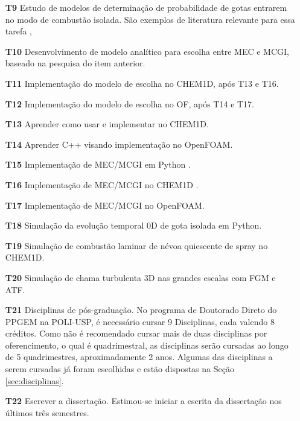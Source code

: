 \begin{itemize}
    \item[\textbf{T9 }] Estudo de modelos de determinação de probabilidade de gotas entrarem no modo de combustão isolada. São exemplos de literatura relevante para essa tarefa \cite{AggarwalS2014}, \source{}
    \item[\textbf{T10}] Desenvolvimento de modelo analítico para escolha entre MEC e MCGI, baseado na pesquisa do item anterior.
    \item[\textbf{T11}] Implementação do modelo de escolha no CHEM1D, após T13 e T16.
    \item[\textbf{T12}] Implementação do modelo de escolha no OF, após T14 e T17.
    
    \item[\textbf{T13}] Aprender como usar e implementar no CHEM1D.
    \item[\textbf{T14}] Aprender C++ visando implementação no OpenFOAM.
    
    \item[\textbf{T15}] Implementação de MEC/MCGI em Python  .%
    \item[\textbf{T16}] Implementação de MEC/MCGI no CHEM1D  .%
    \item[\textbf{T17}] Implementação de MEC/MCGI no OpenFOAM.%
    
    \item[\textbf{T18}] Simulação da evolução temporal 0D de gota isolada em Python.           %
    \item[\textbf{T19}] Simulação de combustão laminar de névoa quiescente de spray no CHEM1D. %
    \item[\textbf{T20}] Simulação de chama turbulenta 3D nas grandes escalas com FGM e ATF.    %
    
    \item[\textbf{T21}] Disciplinas de pós-graduação. No programa de Doutorado Direto do PPGEM na POLI-USP, é necessário cursar 9 Disciplinas, cada valendo 8 créditos. Como não é recomendado cursar mais de duas disciplinas por oferencimento, o qual é quadrimestral, as disciplinas serão cursadas ao longo de 5 quadrimestres, aproximadamente 2 anos. Algumas das disciplinas a serem cursadas já foram escolhidas e estão dispostas na Seção \ref{sec:disciplinas}.
    \item[\textbf{T22}] Escrever a dissertação. Estimou-se iniciar a escrita da dissertação nos últimos três semestres.
\end{itemize}


